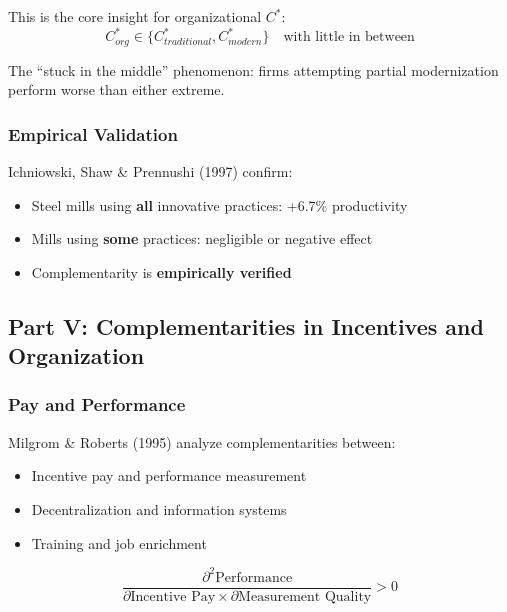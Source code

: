 This is the core insight for organizational $C^*$:
\begin{equation}
C^*_{org} \in \{C^*_{traditional}, C^*_{modern}\} \quad \text{with little in between}
\end{equation}

The ``stuck in the middle'' phenomenon: firms attempting partial modernization 
perform worse than either extreme.

\subsubsection{Empirical Validation}

Ichniowski, Shaw \& Prennushi (1997) confirm:
\begin{itemize}
    \item Steel mills using \textbf{all} innovative practices: +6.7\% productivity
    \item Mills using \textbf{some} practices: negligible or negative effect
    \item Complementarity is \textbf{empirically verified}
\end{itemize}

\subsection{Part V: Complementarities in Incentives and Organization}

\subsubsection{Pay and Performance}

Milgrom \& Roberts (1995) analyze complementarities between:
\begin{itemize}
    \item Incentive pay and performance measurement
    \item Decentralization and information systems
    \item Training and job enrichment
\end{itemize}

\begin{equation}
\frac{\partial^2 \text{Performance}}{\partial \text{Incentive Pay} \times \partial \text{Measurement Quality}} > 0
\end{equation}

